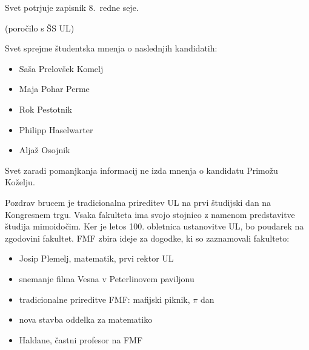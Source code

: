 \documentclass{seja}
\begin{document}
  
  \begin{ad}

    \item

    \begin{sklep*}

      Svet potrjuje zapisnik 8.~redne seje.

    \end{sklep*}

    
    \item

    (poročilo s ŠS UL)

    
    \item

    \begin{sklep*}

      Svet sprejme študentska mnenja o naslednjih kandidatih:

      \begin{itemize}

        \item Saša Prelovšek Komelj

        \item Maja Pohar Perme

        \item Rok Pestotnik

        \item Philipp Haselwarter

        \item Aljaž Osojnik

      \end{itemize}

      
      Svet zaradi pomanjkanja informacij ne izda mnenja o kandidatu Primožu Koželju.

    \end{sklep*}

    
    \item

    Pozdrav brucem je tradicionalna prireditev UL na prvi študijski dan na Kongresnem trgu. Vsaka 
    fakulteta ima svojo stojnico z namenom predstavitve študija mimoidočim. Ker je letos 100. 
    obletnica ustanovitve UL, bo poudarek na zgodovini fakultet. FMF zbira ideje za dogodke, ki so 
    zaznamovali fakulteto:

    \begin{itemize}

      \item Josip Plemelj, matematik, prvi rektor UL

      \item snemanje filma Vesna v Peterlinovem paviljonu

      \item tradicionalne prireditve FMF: mafijski piknik, $\pi$ dan

      \item nova stavba oddelka za matematiko

      \item Haldane, častni profesor na FMF

    \end{itemize}

    
  \end{ad}

  
\end{document}
